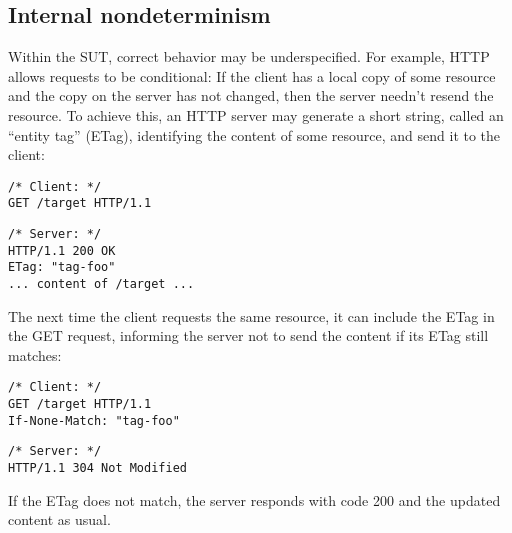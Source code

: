 \subsection{Internal nondeterminism}
Within the SUT, correct behavior may be \mbox{underspecified}.  For example,
HTTP~\cite{rfc7232} allows requests to be conditional: If the client has a local
copy of some resource and the copy on the server has not changed, then the
server needn't resend the resource.  To achieve this, an HTTP server may
generate a short string, called an ``entity tag'' (ETag), identifying the
content of some resource, and send it to the client:
\begin{center}
  \begin{minipage}[t]{.4\textwidth}
    \begin{lstlisting}[style=customc]
/* Client: */
GET /target HTTP/1.1
    \end{lstlisting}
  \end{minipage}\begin{minipage}[t]{.4\textwidth}
    \begin{lstlisting}[style=customc]
/* Server: */
HTTP/1.1 200 OK
ETag: "tag-foo"
... content of /target ...
    \end{lstlisting}
  \end{minipage}
\end{center}
The next time the client requests the same resource, it can include the ETag in
the GET request, informing the server not to send the content if its ETag still
matches:
\begin{center}
\begin{minipage}[t]{.4\textwidth}
\begin{lstlisting}[style=customc]
/* Client: */
GET /target HTTP/1.1
If-None-Match: "tag-foo"
\end{lstlisting}
\end{minipage}\begin{minipage}[t]{.4\textwidth}
\begin{lstlisting}[style=customc]
/* Server: */
HTTP/1.1 304 Not Modified
\end{lstlisting}
\end{minipage}
\end{center}
If the ETag does not match, the server responds with code 200 and the updated
content as usual.


